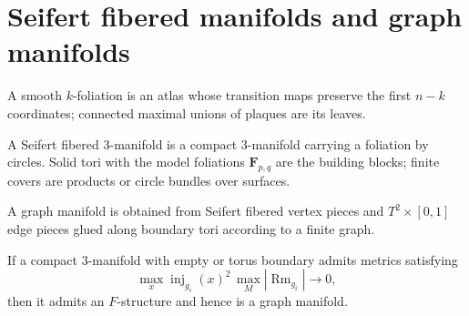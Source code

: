 \section{Seifert fibered manifolds and graph manifolds}

\begin{definition}[Foliation]
\label{def:chow-iv-foliation}
A smooth \(k\)-foliation is an atlas whose transition maps preserve the first
\(n-k\) coordinates; connected maximal unions of plaques are its leaves.
\end{definition}

\begin{definition}
\label{def:chow-iv-seifert-fibered}
A Seifert fibered 3-manifold is a compact 3-manifold carrying a foliation by
circles.  Solid tori with the model foliations \(\mathbf F_{p,q}\) are the
building blocks; finite covers are products or circle bundles over surfaces.
\end{definition}

\begin{definition}
\label{def:chow-iv-graph-manifold}
A graph manifold is obtained from Seifert fibered vertex pieces and
\(T^2\times[0,1]\) edge pieces glued along boundary tori according to a finite
graph.
\end{definition}

\begin{theorem}
\label{thm:chow-iv-cheeger-gromov-graph-manifold}
If a compact 3-manifold with empty or torus boundary admits metrics satisfying
\[
\max_x\operatorname{inj}_{g_i}(x)^2\,\max_M|\operatorname{Rm}_{g_i}|\longrightarrow0,
\]
then it admits an \(F\)-structure and hence is a graph manifold.
\end{theorem}
